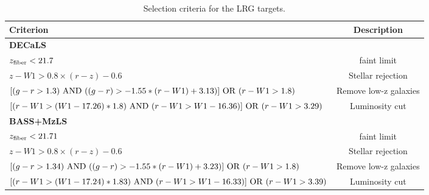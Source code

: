 \begin{table}
  \begin{center}
    \caption{Selection criteria for the LRG targets.}
    \label{tab:ts}
    \begin{tabular}{lc}
    \hline
      \textbf{Criterion} &\textbf{Description}\\
      \hline   
     \textbf{DECaLS} & \\ 
     $z_{\rm fiber} < 21.7$  & faint limit  \\
     $z - W1 > 0.8 \times (r - z) - 0.6$ & Stellar rejection  \\
     $[(g-r >1.3)~{\rm AND}~((g-r) > -1.55*(r-W1) + 3.13)]~{\rm OR}~(r -W 1 > 1.8)$ & Remove low-z galaxies \\
     $[(r-W1 > (W1 - 17.26)*1.8)~{\rm AND}~(r - W1 > W1 - 16.36)]~{\rm OR}~(r-W1 > 3.29)$ & Luminosity cut \\ 
    \hline
     \textbf{BASS+MzLS} & \\ 
     $z_{\rm fiber} < 21.71$  & faint limit  \\
     $z - W1 > 0.8 \times (r - z) - 0.6$ & Stellar rejection  \\
     $[(g-r >1.34)~{\rm AND}~((g-r) > -1.55*(r-W1) + 3.23)]~{\rm OR}~(r -W 1 > 1.8)$ & Remove low-z galaxies \\
     $[(r-W1 > (W1 - 17.24)*1.83)~{\rm AND}~(r - W1 > W1 - 16.33)]~{\rm OR}~(r-W1 > 3.39)$ & Luminosity cut \\ 
      \hline
      \end{tabular}
  \end{center}
\end{table}